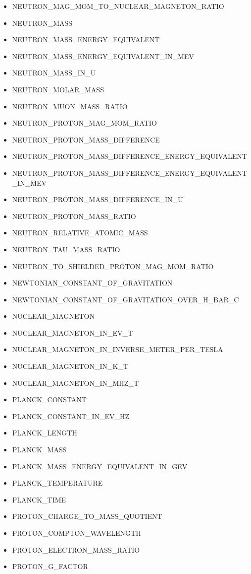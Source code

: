 \begin{itemize}
\item NEUTRON\_MAG\_MOM\_TO\_NUCLEAR\_MAGNETON\_RATIO
\item NEUTRON\_MASS
\item NEUTRON\_MASS\_ENERGY\_EQUIVALENT
\item NEUTRON\_MASS\_ENERGY\_EQUIVALENT\_IN\_MEV
\item NEUTRON\_MASS\_IN\_U
\item NEUTRON\_MOLAR\_MASS
\item NEUTRON\_MUON\_MASS\_RATIO
\item NEUTRON\_PROTON\_MAG\_MOM\_RATIO
\item NEUTRON\_PROTON\_MASS\_DIFFERENCE
\item NEUTRON\_PROTON\_MASS\_DIFFERENCE\_ENERGY\_EQUIVALENT
\item NEUTRON\_PROTON\_MASS\_DIFFERENCE\_ENERGY\_EQUIVALENT\_IN\_MEV
\item NEUTRON\_PROTON\_MASS\_DIFFERENCE\_IN\_U
\item NEUTRON\_PROTON\_MASS\_RATIO
\item NEUTRON\_RELATIVE\_ATOMIC\_MASS
\item NEUTRON\_TAU\_MASS\_RATIO
\item NEUTRON\_TO\_SHIELDED\_PROTON\_MAG\_MOM\_RATIO
\item NEWTONIAN\_CONSTANT\_OF\_GRAVITATION
\item NEWTONIAN\_CONSTANT\_OF\_GRAVITATION\_OVER\_H\_BAR\_C
\item NUCLEAR\_MAGNETON
\item NUCLEAR\_MAGNETON\_IN\_EV\_T
\item NUCLEAR\_MAGNETON\_IN\_INVERSE\_METER\_PER\_TESLA
\item NUCLEAR\_MAGNETON\_IN\_K\_T
\item NUCLEAR\_MAGNETON\_IN\_MHZ\_T
\item PLANCK\_CONSTANT
\item PLANCK\_CONSTANT\_IN\_EV\_HZ
\item PLANCK\_LENGTH
\item PLANCK\_MASS
\item PLANCK\_MASS\_ENERGY\_EQUIVALENT\_IN\_GEV
\item PLANCK\_TEMPERATURE
\item PLANCK\_TIME
\item PROTON\_CHARGE\_TO\_MASS\_QUOTIENT
\item PROTON\_COMPTON\_WAVELENGTH
\item PROTON\_ELECTRON\_MASS\_RATIO
\item PROTON\_G\_FACTOR

\end{itemize}
